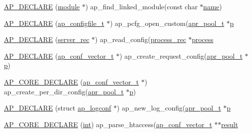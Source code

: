 \begin{DoxyCompactItemize}
\item 
\hyperlink{group__APACHE__CORE__CONFIG_gaa10896b8a0ff851fccdc9866146cfe16}{A\+P\+\_\+\+D\+E\+C\+L\+A\+RE} (\hyperlink{group__APACHE__CORE__CONFIG_ga0ea4f633a5f9f88e1603aaeb1f2b2e69}{module} $\ast$) ap\+\_\+find\+\_\+linked\+\_\+module(const char $\ast$\hyperlink{pcre_8txt_a5a15d68aadb41c771fe50a27c400d49b}{name})
\item 
\hyperlink{group__APACHE__CORE__CONFIG_ga39aef2470a7166007b4809f9f857fd91}{A\+P\+\_\+\+D\+E\+C\+L\+A\+RE} (\hyperlink{structap__configfile__t}{ap\+\_\+configfile\+\_\+t} $\ast$) ap\+\_\+pcfg\+\_\+open\+\_\+custom(\hyperlink{structapr__pool__t}{apr\+\_\+pool\+\_\+t} $\ast$\hyperlink{group__APACHE__CORE__MPM_ga5cd91701e5c167f2b1a38e70ab57817e}{p}
\item 
\hyperlink{group__APACHE__CORE__CONFIG_ga75912088f9d8c16106a58fdd0f4f9fad}{A\+P\+\_\+\+D\+E\+C\+L\+A\+RE} (\hyperlink{structserver__rec}{server\+\_\+rec} $\ast$) ap\+\_\+read\+\_\+config(\hyperlink{structprocess__rec}{process\+\_\+rec} $\ast$\hyperlink{pcretest_8txt_a8ec73ad58a04604170bd96796a2075a8}{process}
\item 
\hyperlink{group__APACHE__CORE__CONFIG_ga25bc9337264c950aad88703cd8a6515b}{A\+P\+\_\+\+D\+E\+C\+L\+A\+RE} (\hyperlink{group__APACHE__CORE__CONFIG_ga614684670dbf748a70ac6bad272da59c}{ap\+\_\+conf\+\_\+vector\+\_\+t} $\ast$) ap\+\_\+create\+\_\+request\+\_\+config(\hyperlink{structapr__pool__t}{apr\+\_\+pool\+\_\+t} $\ast$\hyperlink{group__APACHE__CORE__MPM_ga5cd91701e5c167f2b1a38e70ab57817e}{p})
\item 
\hyperlink{group__APACHE__CORE__CONFIG_gaf855230aa338dd637add3a0908d0006a}{A\+P\+\_\+\+C\+O\+R\+E\+\_\+\+D\+E\+C\+L\+A\+RE} (\hyperlink{group__APACHE__CORE__CONFIG_ga614684670dbf748a70ac6bad272da59c}{ap\+\_\+conf\+\_\+vector\+\_\+t} $\ast$) ap\+\_\+create\+\_\+per\+\_\+dir\+\_\+config(\hyperlink{structapr__pool__t}{apr\+\_\+pool\+\_\+t} $\ast$\hyperlink{group__APACHE__CORE__MPM_ga5cd91701e5c167f2b1a38e70ab57817e}{p})
\item 
\hyperlink{group__APACHE__CORE__CONFIG_ga7635f0aac74861bf7e3402c9e0f80cd2}{A\+P\+\_\+\+D\+E\+C\+L\+A\+RE} (struct \hyperlink{structap__logconf}{ap\+\_\+logconf} $\ast$) ap\+\_\+new\+\_\+log\+\_\+config(\hyperlink{structapr__pool__t}{apr\+\_\+pool\+\_\+t} $\ast$\hyperlink{group__APACHE__CORE__MPM_ga5cd91701e5c167f2b1a38e70ab57817e}{p}
\item 
\hyperlink{group__APACHE__CORE__CONFIG_ga6166c27227bc6b409aacd437b2a4008e}{A\+P\+\_\+\+C\+O\+R\+E\+\_\+\+D\+E\+C\+L\+A\+RE} (\hyperlink{pcre_8txt_a42dfa4ff673c82d8efe7144098fbc198}{int}) ap\+\_\+parse\+\_\+htaccess(\hyperlink{group__APACHE__CORE__CONFIG_ga614684670dbf748a70ac6bad272da59c}{ap\+\_\+conf\+\_\+vector\+\_\+t} $\ast$$\ast$\hyperlink{pcretest_8txt_ada864abbb1600264b4da826e87c60355}{result}
$$
\end{DoxyCompactItemize}

